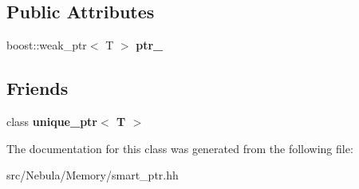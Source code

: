 \subsection*{Public Attributes}
\begin{DoxyCompactItemize}
\item 
\hypertarget{classNeb_1_1weak__ptr_a9ffc8d0fd4564e9e82d6827570768603}{boost\-::weak\-\_\-ptr$<$ T $>$ {\bfseries ptr\-\_\-}}\label{classNeb_1_1weak__ptr_a9ffc8d0fd4564e9e82d6827570768603}

\end{DoxyCompactItemize}
\subsection*{Friends}
\begin{DoxyCompactItemize}
\item 
\hypertarget{classNeb_1_1weak__ptr_af421c41ed797729bb606ba7df50551aa}{class {\bfseries unique\-\_\-ptr$<$ T $>$}}\label{classNeb_1_1weak__ptr_af421c41ed797729bb606ba7df50551aa}

\end{DoxyCompactItemize}


The documentation for this class was generated from the following file\-:\begin{DoxyCompactItemize}
\item 
src/\-Nebula/\-Memory/smart\-\_\-ptr.\-hh\end{DoxyCompactItemize}
